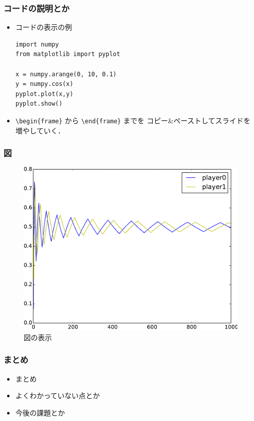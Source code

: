 \documentclass[dvipdfmx,fleqn]{beamer}
\begin{document}
\begin{frame}[containsverbatim]%
\frametitle{コードの説明とか}
\begin{itemize}\setlength{\parskip}{0.5em}
\item
コードの表示の例
\begin{verbatim}
import numpy
from matplotlib import pyplot

x = numpy.arange(0, 10, 0.1)
y = numpy.cos(x)
pyplot.plot(x,y)
pyplot.show()
\end{verbatim}

\item
\verb|\begin{frame}| から \verb|\end{frame}| までを
コピー\&ペーストしてスライドを増やしていく．
\end{itemize}
\end{frame}



\begin{frame}
\frametitle{図}
\begin{figure}
 \centering
 \includegraphics[bb=0 0 200 100]{fictitious_graph1.0.pdf}
 \caption{図の表示}
 \label{fig:matchingpennies_plot}
\end{figure}
\end{frame}



\begin{frame}
\frametitle{まとめ}
\begin{itemize}\setlength{\parskip}{0.5em}
\item
まとめ

\item
よくわかっていない点とか

\item
今後の課題とか
\end{itemize}
\end{frame}
\end{document}
